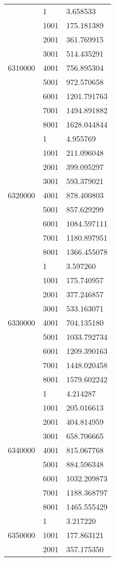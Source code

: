 \begin{table}[htb!]
\begin{tabular}{lll}
\multirow[c]{9}{*}{6310000} & 1 & 3.658533 \\
 & 1001 & 175.181389 \\
 & 2001 & 361.769915 \\
 & 3001 & 514.435291 \\
 & 4001 & 756.895304 \\
 & 5001 & 972.570658 \\
 & 6001 & 1201.791763 \\
 & 7001 & 1494.891882 \\
 & 8001 & 1628.044844 \\
\multirow[c]{9}{*}{6320000} & 1 & 4.955769 \\
 & 1001 & 211.096048 \\
 & 2001 & 399.095297 \\
 & 3001 & 593.379021 \\
 & 4001 & 878.400803 \\
 & 5001 & 857.629299 \\
 & 6001 & 1084.597111 \\
 & 7001 & 1180.897951 \\
 & 8001 & 1366.455078 \\
\multirow[c]{9}{*}{6330000} & 1 & 3.597260 \\
 & 1001 & 175.740957 \\
 & 2001 & 377.246857 \\
 & 3001 & 533.163071 \\
 & 4001 & 704.135180 \\
 & 5001 & 1033.792734 \\
 & 6001 & 1209.390163 \\
 & 7001 & 1448.020458 \\
 & 8001 & 1579.602242 \\
\multirow[c]{9}{*}{6340000} & 1 & 4.214287 \\
 & 1001 & 205.016613 \\
 & 2001 & 404.814959 \\
 & 3001 & 658.706665 \\
 & 4001 & 815.067768 \\
 & 5001 & 884.596348 \\
 & 6001 & 1032.209873 \\
 & 7001 & 1188.368797 \\
 & 8001 & 1465.555429 \\
\multirow[c]{9}{*}{6350000} & 1 & 3.217220 \\
 & 1001 & 177.863121 \\
 & 2001 & 357.175350 \\

\end{tabular}
\end{table}
